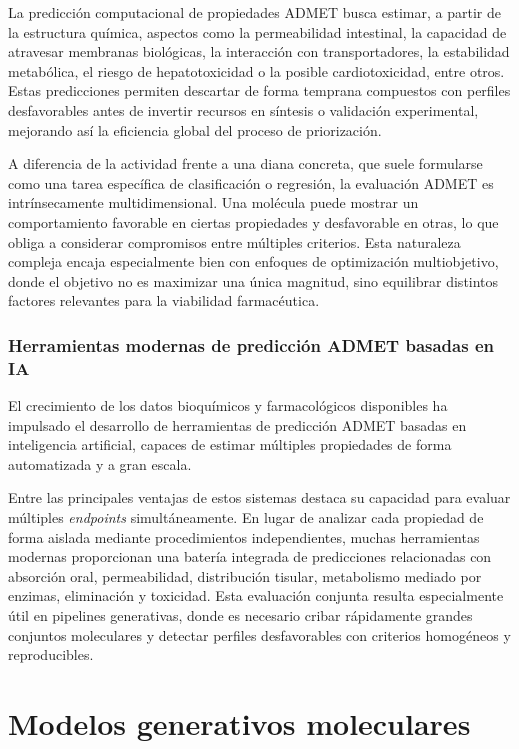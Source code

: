 \documentclass[IB]{TFUOC}%
\begin{document}
La predicción computacional de propiedades ADMET busca estimar, a partir de la estructura química, aspectos como la permeabilidad intestinal, la capacidad de atravesar membranas biológicas, la interacción con transportadores, la estabilidad metabólica, el riesgo de hepatotoxicidad o la posible cardiotoxicidad, entre otros. Estas predicciones permiten descartar de forma temprana compuestos con perfiles desfavorables antes de invertir recursos en síntesis o validación experimental, mejorando así la eficiencia global del proceso de priorización.

A diferencia de la actividad frente a una diana concreta, que suele formularse como una tarea específica de clasificación o regresión, la evaluación ADMET es intrínsecamente multidimensional. Una molécula puede mostrar un comportamiento favorable en ciertas propiedades y desfavorable en otras, lo que obliga a considerar compromisos entre múltiples criterios. Esta naturaleza compleja encaja especialmente bien con enfoques de optimización multiobjetivo, donde el objetivo no es maximizar una única magnitud, sino equilibrar distintos factores relevantes para la viabilidad farmacéutica.

\subsubsection{Herramientas modernas de predicción ADMET basadas en IA}

El crecimiento de los datos bioquímicos y farmacológicos disponibles ha impulsado el desarrollo de herramientas de predicción ADMET basadas en inteligencia artificial, capaces de estimar múltiples propiedades de forma automatizada y a gran escala.

Entre las principales ventajas de estos sistemas destaca su capacidad para evaluar múltiples \textit{endpoints} simultáneamente. En lugar de analizar cada propiedad de forma aislada mediante procedimientos independientes, muchas herramientas modernas proporcionan una batería integrada de predicciones relacionadas con absorción oral, permeabilidad, distribución tisular, metabolismo mediado por enzimas, eliminación y toxicidad. Esta evaluación conjunta resulta especialmente útil en pipelines generativas, donde es necesario cribar rápidamente grandes conjuntos moleculares y detectar perfiles desfavorables con criterios homogéneos y reproducibles.


\section{Modelos generativos moleculares}
\end{document}
